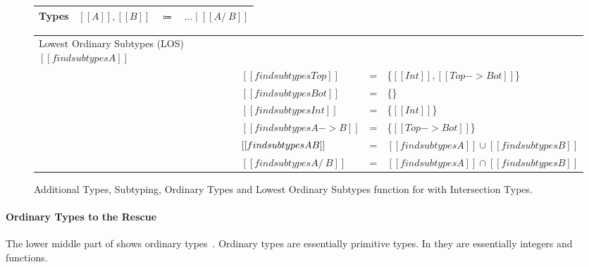 \begin{figure}[t]
  \begin{small}
    \centering
    \begin{tabular}{lrcl} \toprule
      Types & $[[A]], [[B]]$ & $\Coloneqq$ & $ ... \mid [[A /\ B]] $ \\
      \bottomrule
    \end{tabular}
  \end{small}
  \medskip
    \begin{small}
    \centering
  \end{small}
  \medskip
    \begin{small}
    \centering
  \end{small}
  \medskip
    \centering
    {\renewcommand{\arraystretch}{1.2}
    \begin{tabular}{|llcl|}
      \hline
      Lowest Ordinary Subtypes (LOS) $[[findsubtypes A]]$ &  & & \\
     & $[[findsubtypes Top]]$ & = & \{$ [[Int]], [[Top -> Bot]]$\}  \\
     & $[[findsubtypes Bot]]$ & = & \{\}  \\
     & $[[findsubtypes Int]]$ & = & \{$ [[Int]] $\}  \\
     & $[[findsubtypes A -> B]]$ & = & \{$ [[Top -> Bot]] $\}  \\
     & $[[findsubtypes A \/ B]]$ & = & $ [[findsubtypes A]] \cup [[findsubtypes B]] $\\
     & $[[findsubtypes A /\ B]]$ & = & $ [[findsubtypes A]] \cap [[findsubtypes B]] $\\
      \hline
    \end{tabular} }
  \caption{Additional Types, Subtyping, Ordinary Types and Lowest Ordinary Subtypes function for \cal with Intersection Types.}
  \label{fig:inter:system}
\end{figure}

\paragraph{Ordinary Types to the Rescue}
The lower middle part of
 shows ordinary types~\cite{}.
Ordinary types are essentially primitive types. In \cal they
are essentially integers and functions. 

